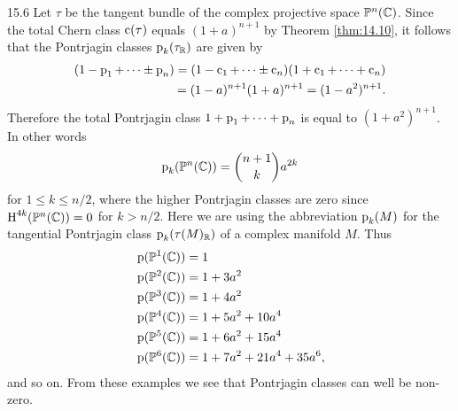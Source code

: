 \documentclass[../main]{subfiles}
\begin{document}
\begin{customexample}{15.6}
\label{ex:15.06}
Let $\tau$ be the tangent bundle of the complex projective space $\mathbb{P}^n(\mathbb C)$. Since the total Chern class $\operatorname{c}(\tau)$ equals $(1+a)^{n+1}$ by Theorem \ref{thm:14.10}, it follows that  the Pontrjagin classes $\operatorname{p}_k(\tau_\mathbb R)$ are given by \[\begin{split}(1-\operatorname{p}_1+\cdots \pm \operatorname{p}_n) = (1-\operatorname{c}_1 + \cdots \pm \operatorname{c}_n)(1+\operatorname{c}_1+\cdots+\operatorname{c}_n) \\ = (1-a)^{n+1}(1+a)^{n+1} = (1-a^2)^{n+1}. \end{split}\] Therefore the total Pontrjagin class $1+\operatorname{p}_1+\cdots+\operatorname{p}_n$ is equal to $(1+a^2)^{n+1}$. In other words 
\[\operatorname{p}_k(\mathbb{P}^n(\mathbb C)) = \binom{n+1}{k} a^{2k}\] for $1 \leq k \leq n/2$, where the higher Pontrjagin classes are zero since $\operatorname{H}^{4k}(\mathbb{P}^n(\mathbb C))=0$ for $k > n/2$. Here we are using the abbreviation $\operatorname{p}_k(M)$ for the tangential Pontrjagin class $\operatorname{p}_k(\tau(M)_\mathbb R)$ of a complex manifold $M$. Thus 
\[\begin{split} &\operatorname{p}(\mathbb{P}^1(\mathbb C)) = 1 \\ &\operatorname{p}(\mathbb{P}^2(\mathbb C)) = 1 +3a^2 \\ &\operatorname{p}(\mathbb{P}^3(\mathbb C)) = 1 + 4a^2 \\ &\operatorname{p}(\mathbb{P}^4(\mathbb C)) = 1 + 5a^2 + 10a^4 \\ &\operatorname{p}(\mathbb{P}^5(\mathbb C)) = 1 + 6a^2 + 15a^4 \\ &\operatorname{p}(\mathbb{P}^6(\mathbb C))  = 1 + 7a^2 + 21a^4 + 35a^6, \end{split}\] and so on. From these examples we see that Pontrjagin classes can well be non-zero.
\end{customexample}
\end{document}

